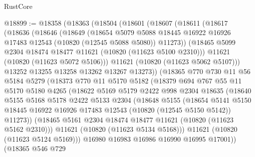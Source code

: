 \begin{lexlean}{RustCore}
\begin{coremodule}
@18899 := @18358
    (@18363
      (@18504
        (@18601
          (@18607
            (@18611
              (@18617
                (@18636
                  (@18646
                    (@18649
                      (@18654
                        @5079
                        @5088
                        @18445
                        @16922
                        @16926
                        @17483
                        @12543
                        (@10820 (@12545 @5088 @5080))
                        @11273))
                    (@18465 @5099 @2304 @18474 @18477 @11621 (@10820 (@11623 @5100 @2310)))
                    @11621
                    (@10820 (@11623 @5072 @5106)))
                  @11621
                  (@10820 (@11623 @5062 @5107)))
                @13252
                @13255
                @13258
                @13262
                @13267
                @13273))
            (@18365
              @770
              @730
              @11
              @56
              @5184
              @5279
              (@18373
                @770
                @11
                @5170
                @5182
                (@18379
                  @694
                  @767
                  @55
                  @11
                  @5170
                  @5180
                  @4265
                  (@18622
                    @5169
                    @5179
                    @2422
                    @998
                    @2304
                    @18635
                    (@18640
                      @5155
                      @5168
                      @5178
                      @2422
                      @5133
                      @2304
                      (@18648
                        @5155
                        (@18654
                          @5141
                          @5150
                          @18445
                          @16922
                          @16926
                          @17483
                          @12543
                          (@10820 (@12545 @5150 @5142))
                          @11273))
                      (@18465 @5161 @2304 @18474 @18477 @11621 (@10820 (@11623 @5162 @2310)))
                      @11621
                      (@10820 (@11623 @5134 @5168)))
                    @11621
                    (@10820 (@11623 @5124 @5169)))
                  @16980
                  @16983
                  @16986
                  @16990
                  @16995
                  @17001))
              (@18365
                @546
                @729

\end{coremodule}
\end{lexlean}
